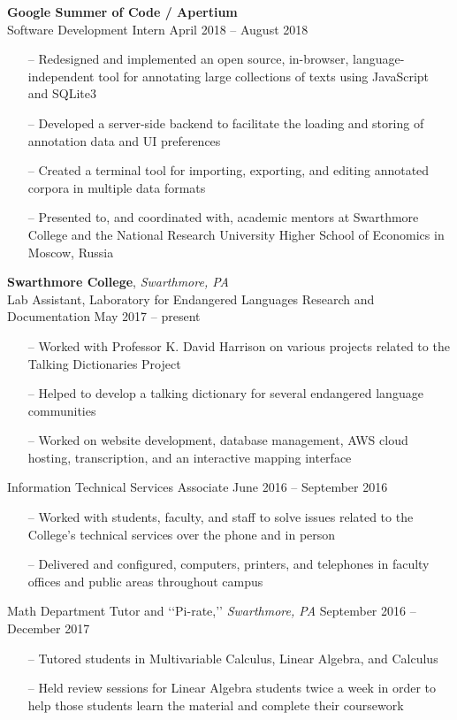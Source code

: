\documentclass[paper=a4, fontsize=11pt]{scrartcl} %
\newcommand{\I}{--}
\begin{document}
\textbf{Google Summer of Code / Apertium}\\
Software Development Intern \hfill April 2018 -- August 2018
\begin{itemize}[topsep=0pt,noitemsep]
  \item[\I] Redesigned and implemented an open source, in-browser, language-independent tool for annotating large collections of texts using JavaScript and SQLite3
  \item[\I] Developed a server-side backend to facilitate the loading and storing of annotation data and UI preferences
  \item[\I] Created a terminal tool for importing, exporting, and editing annotated corpora in multiple data formats
  \item[\I] Presented to, and coordinated with, academic mentors at Swarthmore College and the National Research University Higher School of Economics in Moscow, Russia
\end{itemize}

\vspace{1mm}

\textbf{Swarthmore College}, \textit{Swarthmore, PA} \\
Lab Assistant, Laboratory for Endangered Languages Research and Documentation \hfill May 2017 -- present
\begin{itemize}[topsep=0pt,noitemsep]
	\item[\I] Worked with Professor K. David Harrison on various projects related to the Talking Dictionaries Project
	\item[\I] Helped to develop a talking dictionary for several endangered language communities
	\item[\I] Worked on website development, database management, AWS cloud hosting, transcription, and an interactive mapping interface
\end{itemize}

Information Technical Services Associate \hfill June 2016 -- September 2016
\begin{itemize}[topsep=0pt,noitemsep]
	\item[\I] Worked with students, faculty, and staff to solve issues related to the College's technical services over the phone and in person
  \item[\I] Delivered and configured, computers, printers, and telephones in faculty offices and public areas throughout campus
\end{itemize}

Math Department Tutor and \lq\lq{Pi-rate,}\rq\rq{ }\textit{Swarthmore, PA} \hfill September 2016 -- December 2017
\begin{itemize}[topsep=0pt,noitemsep]
	\item[\I] Tutored students in Multivariable Calculus, Linear Algebra, and Calculus
	\item[\I] Held review sessions for Linear Algebra students twice a week in order to help those students learn the material and complete their coursework
\end{itemize}
\end{document}
